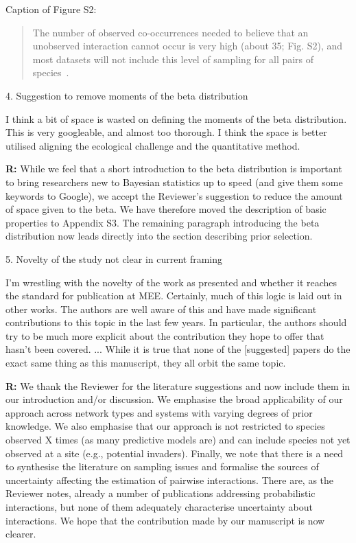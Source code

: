 \documentclass[12pt]{letter}
\newenvironment{refquote}{\bigskip \begin{it}}{\end{it}\smallskip}
\begin{document}
		Caption of Figure S2:


		\begin{quotation}
			The number of observed co-occurrences needed to believe that an unobserved interaction cannot occur is very high (about 35; Fig. S2), and most datasets will not include this level of sampling for all pairs of species~\citep{Bartomeus2013}.
		\end{quotation}


	4. Suggestion to remove moments of the beta distribution


		\begin{refquote}
		I think a bit of space is wasted on defining the moments of the beta distribution. This is very googleable, and almost too thorough. I think the space is better utilised aligning the ecological challenge and the quantitative method.
		\end{refquote}


		\textbf{R:} While we feel that a short introduction to the beta distribution is important to bring researchers new to Bayesian statistics up to speed (and give them some keywords to Google), we accept the Reviewer's suggestion to reduce the amount of space given to the beta. We have therefore moved the description of basic properties to Appendix S3. The remaining paragraph introducing the beta distribution now leads directly into the section describing prior selection.


	5. Novelty of the study not clear in current framing


		\begin{refquote}
		I'm wrestling with the novelty of the work as presented and whether it reaches the standard for publication at MEE. Certainly, much of this logic is laid out in other works. The authors are well aware of this and have made significant contributions to this topic in the last few years. In particular, the authors should try to be much more explicit about the contribution they hope to offer that hasn't been covered. ...
		While it is true that none of the [suggested] papers do the exact same thing as this manuscript, they all	orbit the same topic. 
		\end{refquote}


		\textbf{R:} We thank the Reviewer for the literature suggestions and now include them in our introduction and/or discussion. We emphasise the broad applicability of our approach across network types and systems with varying degrees of prior knowledge. We also emphasise that our approach is not restricted to species observed X times (as many predictive models are) and can include species not yet observed at a site (e.g., potential invaders). Finally, we note that there is a need to synthesise the literature on sampling issues and formalise the sources of uncertainty affecting the estimation of pairwise interactions. There are, as the Reviewer notes, already a number of publications addressing probabilistic interactions, but none of them adequately characterise uncertainty about interactions. We hope that the contribution made by our manuscript is now clearer.
\end{document}
